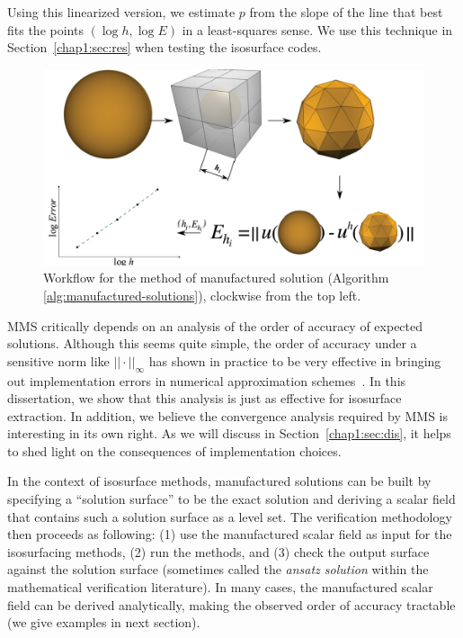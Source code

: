 Using this linearized version, we estimate $p$ from the slope of 
the line that best fits the points $(\log h,\log E)$ in a
least-squares sense. We use this technique in Section~\ref{chap1:sec:res}
when testing the isosurface codes.

\begin{figure}[t]
\centering
\includegraphics[width=0.95\linewidth,keepaspectratio=true]{chapter2/figures/mms.pdf}
\caption{\label{fig:mms-flow}Workflow for the method of manufactured solution (Algorithm \ref{alg:manufactured-solutions}), clockwise from the top left.}
\end{figure}

MMS critically depends on an analysis of the order of accuracy of
expected solutions. Although this seems quite simple, the order of
accuracy under a sensitive norm like $||\cdot||_\infty$ has shown in
practice to be very effective in bringing out implementation errors in
numerical approximation schemes~\cite{Roy2005,babuska04}. In this
dissertation, we show that this analysis is just as effective for isosurface
extraction. In addition, we believe the convergence analysis required
by MMS is interesting in its own right. As we will discuss in
Section~\ref{chap1:sec:dis}, it helps to shed light on the consequences of
implementation choices.

In the context of isosurface methods, manufactured solutions can be built by
specifying a ``solution surface'' to be the exact solution and deriving a 
scalar field that contains such a solution surface as a level set. The 
verification methodology then proceeds as following: 
(1) use the manufactured scalar field as input for the isosurfacing 
methods, (2) run the methods, and (3) check the output surface against 
the solution surface (sometimes called the {\em ansatz solution} within
the mathematical verification literature).
In many cases, the manufactured scalar field can be derived analytically, 
making the observed order of accuracy tractable (we give
examples in next section).

